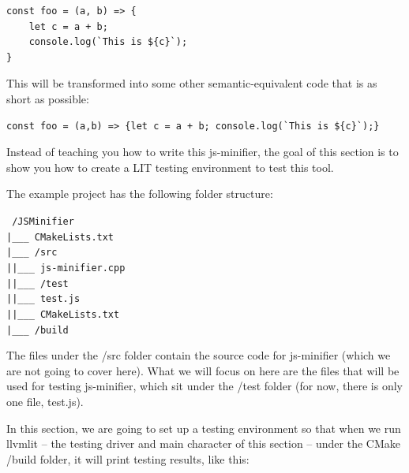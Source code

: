 \begin{lstlisting}[style=styleJavaScript]
const foo = (a, b) => {
	let c = a + b;
	console.log(`This is ${c}`);
}
\end{lstlisting}

This will be transformed into some other semantic-equivalent code that is as short as possible:

\begin{lstlisting}[style=styleJavaScript]
const foo = (a,b) => {let c = a + b; console.log(`This is ${c}`);}
\end{lstlisting}

Instead of teaching you how to write this js-minifier, the goal of this section is to
show you how to create a LIT testing environment to test this tool.

The example project has the following folder structure:

\begin{tcolorbox}[colback=white,colframe=black]
\tt
{}
/JSMinifier \\
\hspace*{0.3cm}|\_\_\_ CMakeLists.txt \\
\hspace*{0.3cm}|\_\_\_ /src \\
\hspace*{0.3cm}|\hspace{1cm}|\_\_\_ js-minifier.cpp \\
\hspace*{0.3cm}|\hspace{1cm}|\_\_\_ /test \\
\hspace*{0.3cm}|\hspace{2.3cm}|\_\_\_ test.js \\
\hspace*{0.3cm}|\hspace{2.3cm}|\_\_\_ CMakeLists.txt \\
\hspace*{0.3cm}|\_\_\_ /build
\end{tcolorbox}

The files under the /src folder contain the source code for js-minifier (which we are not going to cover here). What we will focus on here are the files that will be used for testing js-minifier, which sit under the /test folder (for now, there is only one file, test.js).

In this section, we are going to set up a testing environment so that when we run llvmlit – the testing driver and main character of this section – under the CMake /build folder, it will print testing results, like this:

